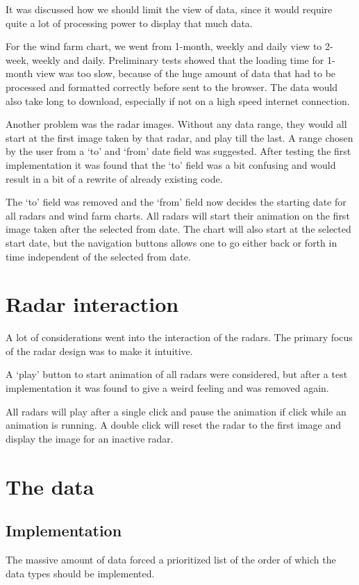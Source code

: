 It was discussed how we should limit the view of data, since it would require quite a lot of processing power to display that much data.

For the wind farm chart, we went from 1-month, weekly and daily view to 2-week, weekly and daily.
Preliminary tests showed that the loading time for 1-month view was too slow, because of the huge amount of data that had to be processed and formatted correctly before sent to the browser. The data would also take long to download, especially if not on a high speed internet connection.

Another problem was the radar images. Without any data range, they would all start at the first image taken by that radar, and play till the last. A range chosen by the user from a `to' and `from' date field was suggested. After testing the first implementation it was found that the `to' field was a bit confusing and would result in a bit of a rewrite of already existing code.

The `to' field was removed and the `from' field now decides the starting date for all radars and wind farm charts.
All radars will start their animation on the first image taken after the selected from date.
The chart will also start at the selected start date, but the navigation buttons allows one to go either back or forth in time independent of the selected from date.

\section{Radar interaction}
A lot of considerations went into the interaction of the radars. The primary focus of the radar design was to make it intuitive.

A `play' button to start animation of all radars were considered, but after a test implementation it was found to give a weird feeling and was removed again.

All radars will play after a single click and pause the animation if click while an animation is running. A double click will reset the radar to the first image and display the image for an inactive radar.

\section{The data}
\subsection{Implementation}
The massive amount of data forced a prioritized list of the order of which the data types should be implemented.

